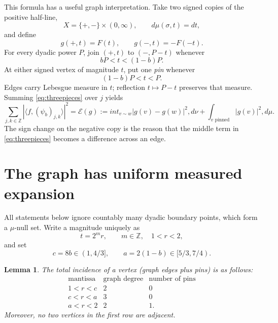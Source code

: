 \documentclass[11pt]{article}
\newtheorem{lemma}{Lemma}
\newcommand{\Z}{\mathbb Z}
\newcommand{\E}{\mathcal E}
\begin{document}
This formula has a useful graph interpretation.  Take two signed copies of
the positive half-line,
\[
 X=\{+,-\}\times(0,\infty),
 \qquad d\mu(\sigma,t)=dt,
\]
and define
\[
 g(+,t)=F(t),\qquad g(-,t)=-F(-t).
\]
For every dyadic power $P$, join $(+,t)$ to $(-,P-t)$ whenever
\begin{equation}\label{eq:edgecondition}
 bP<t<(1-b)P.
\end{equation}
At either signed vertex of magnitude $t$, put one \emph{pin} whenever
\begin{equation}\label{eq:pincondition}
 (1-b)P<t<P.
\end{equation}
Edges carry Lebesgue measure in $t$; reflection $t\mapsto P-t$ preserves that
measure.  Summing \eqref{eq:threepieces} over $j$ yields
\begin{equation}\label{eq:energy}
 \sum_{j,k\in\Z}|\langle f,(\psi_b)_{j,k}\rangle|^2
 =\E(g):=int_{v\sim w}|g(v)-g(w)|^2,d\nu
 +\int_{v\text{ pinned}}|g(v)|^2,d\mu.
\end{equation}
The sign change on the negative copy is the reason that the middle term in
\eqref{eq:threepieces} becomes a difference across an edge.

\section{The graph has uniform measured expansion}

All statements below ignore countably many dyadic boundary points, which form
a $\mu$-null set.  Write a magnitude uniquely as
\begin{equation}\label{eq:mantissa}
 t=2^m r,\qquad m\in\Z,\quad 1<r<2,
\end{equation}
and set
\[
 c=8b\in(1,4/3],\qquad a=2(1-b)\in[5/3,7/4).
\]

\begin{lemma}\label{lem:degrees}
The total incidence of a vertex (graph edges plus pins) is as follows:
\[
\begin{array}{c|c|c}
\text{mantissa}&\text{graph degree}&\text{number of pins}\\ \hline
1<r<c&2&0\\
c<r<a&3&0\\
a<r<2&2&1.
\end{array}
\]
Moreover, no two vertices in the first row are adjacent.
\end{lemma}
\end{document}
